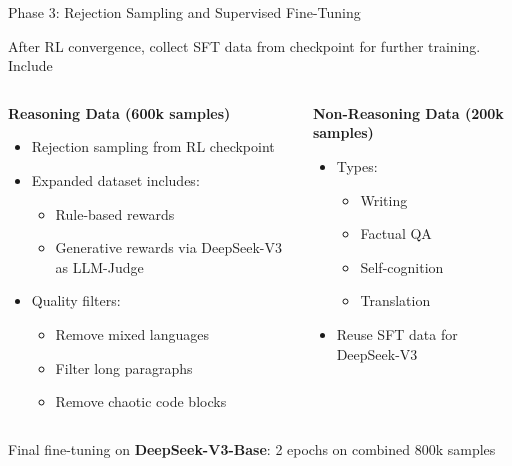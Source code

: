 \documentclass[8pt]{beamer}
\begin{document}
\begin{frame}{Phase 3: Rejection Sampling and Supervised Fine-Tuning}

After RL convergence, collect SFT data from checkpoint for further training. Include

\vspace{1em}

\begin{columns}[t]
\begin{column}{0.5\textwidth}
\textbf{Reasoning Data (600k samples)}
\begin{itemize}
\item Rejection sampling from RL checkpoint
\item Expanded dataset includes:
    \begin{itemize}
    \item Rule-based rewards
    \item Generative rewards via DeepSeek-V3 as LLM-Judge
    \end{itemize}
\item Quality filters:
    \begin{itemize}
    \item Remove mixed languages
    \item Filter long paragraphs
    \item Remove chaotic code blocks
    \end{itemize}
\end{itemize}
\end{column}

\begin{column}{0.5\textwidth}
\textbf{Non-Reasoning Data (200k samples)}
\begin{itemize}
\item Types:
    \begin{itemize}
    \item Writing
    \item Factual QA
    \item Self-cognition
    \item Translation
    \end{itemize}
\item Reuse SFT data for DeepSeek-V3
\end{itemize}
\end{column}
\end{columns}

\vspace{1em}
Final fine-tuning on \textbf{DeepSeek-V3-Base}: 2 epochs on combined 800k samples
\end{frame}
\end{document}
